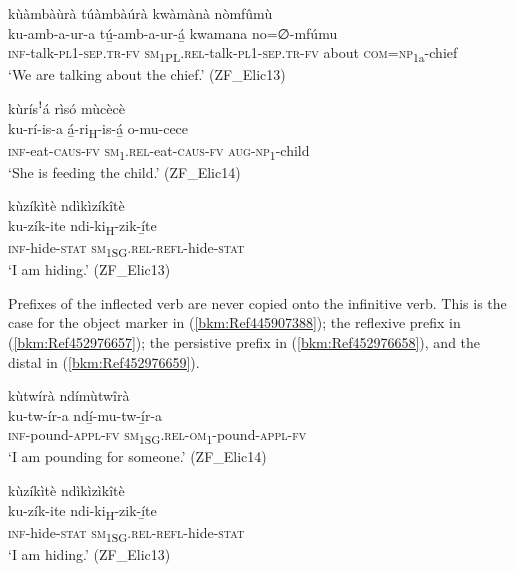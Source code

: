 \ea
\label{bkm:Ref415747170}
kùàmbàùrà túàmbàúrà kwàmànà nòmfûmù\\
\gll ku-amb-a-ur-a    tú̲-amb-a-ur-á̲ kwamana  no=∅-mfúmu \\
\textsc{inf}-talk-\textsc{pl}1-\textsc{sep}.\textsc{tr}-\textsc{fv}  \textsc{sm}\textsubscript{1PL}.\textsc{rel}-talk-\textsc{pl}1-\textsc{sep}.\textsc{tr}-\textsc{fv}
about    \textsc{com}=\textsc{np}\textsubscript{1a}-chief\\
\glt ‘We are talking about the chief.’ (ZF\_Elic13)
\z

\ea
\label{bkm:Ref445907210}
kùrísꜝá  rìsó mùcècè\\
\gll ku-rí-is-a    á̲-ri\textsubscript{H}-is-á̲      o-mu-cece\\
\textsc{inf}-eat-\textsc{caus}-\textsc{fv}  \textsc{sm}\textsubscript{1}.\textsc{rel}-eat-\textsc{caus}-\textsc{fv}  \textsc{aug}-\textsc{np}\textsubscript{1}-child\\
\glt ‘She is feeding the child.’ (ZF\_Elic14)
\z

\ea
\label{bkm:Ref445907286}
kùzíkìtè ndìkìzíkîtè\\
\gll ku-zík-ite    ndi-ki\textsubscript{H}-zik-í̲te\\
\textsc{inf}-hide-\textsc{stat}  \textsc{sm}\textsubscript{1SG}.\textsc{rel}-\textsc{refl}-hide-\textsc{stat}\\
\glt ‘I am hiding.’ (ZF\_Elic13)
\z

Prefixes of the inflected verb are never copied onto the infinitive verb. This is the case for the object marker in (\ref{bkm:Ref445907388}); the reflexive prefix in (\ref{bkm:Ref452976657}); the persistive prefix in (\ref{bkm:Ref452976658}), and the distal in (\ref{bkm:Ref452976659}).

\ea
\label{bkm:Ref445907388}
kùtwírà ndímùtwîrà\\
\gll ku-tw-ír-a      ndí̲-mu-tw-í̲r-a\\
\textsc{inf}-pound-\textsc{appl}-\textsc{fv}  \textsc{sm}\textsubscript{1SG}.\textsc{rel}-\textsc{om}\textsubscript{1}-pound-\textsc{appl}-\textsc{fv}\\
\glt ‘I am pounding for someone.’ (ZF\_Elic14)
\z

\ea
\label{bkm:Ref452976657}
kùzíkìtè ndìkìzìkîtè\\
\gll ku-zík-ite    ndi-ki\textsubscript{H}-zik-í̲te \\
\textsc{inf}-hide-\textsc{stat}  \textsc{sm}\textsubscript{1SG}.\textsc{rel}-\textsc{refl}-hide-\textsc{stat}\\
\glt ‘I am hiding.’ (ZF\_Elic13)
\z

